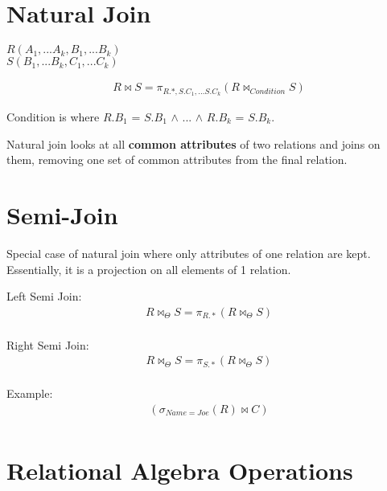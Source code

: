 \documentclass[twoside]{article}
\begin{document}
\section*{Natural Join}
\begin{center}
    $R(A_1,...A_k, B_1,...B_k)$ \\
    $S(B_1,...B_k, C_1,...C_k)$ \\
\end{center}
\begin{gather*}
    R \bowtie S = \pi_{R.*, S.C_1,...S.C_k}(R \bowtie_{Condition} S)
\end{gather*}
\begin{center}
    Condition is where $R.B_1$ = $S.B_1$ $\wedge$ ... $\wedge$ $R.B_k$ = $S.B_k$.
\end{center}
Natural join looks at all \textbf{common attributes} of two relations and joins on
them, removing one set of common attributes from the final relation.

\section*{Semi-Join}
Special case of natural join where only attributes of one relation are kept.
Essentially, it is a projection on all elements of 1 relation.

Left Semi Join:
\begin{gather*}
    R \bowtie_{\Theta} S = \pi_{R.*}(R \bowtie_{\Theta} S) \\
\end{gather*}

Right Semi Join:
\begin{gather*}
    R \bowtie_{\Theta} S = \pi_{S.*}(R \bowtie_{\Theta} S) \\
\end{gather*}

Example:
\begin{gather*}
    (\sigma_{Name=Joe}(R) \bowtie C) \\
\end{gather*}

\newpage
\section{Relational Algebra Operations}
\end{document}
